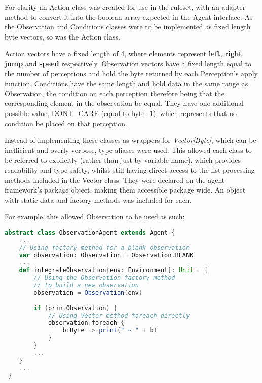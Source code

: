 For clarity an Action class was created for use in the ruleset, with an adapter method to convert it into the boolean array expected in the Agent interface. As the Observation and Conditions classes were to be implemented as fixed length byte vectors, so was the Action class.

Action vectors have a fixed length of 4, where elements represent \textbf{left}, \textbf{right}, \textbf{jump} and \textbf{speed} respectively. Observation vectors have a fixed length equal to the number of perceptions and hold the byte returned by each Perception's apply function. Conditions have the same length and hold data in the same range as Observation, the condition on each perception therefore being that the corresponding element in the observation be equal. They have one additional possible value, {\footnotesize DONT\_CARE} (equal to byte -1), which represents that no condition be placed on that perception.

Instead of implementing these classes as wrappers for \emph{Vector[Byte]}, which can be inefficient and overly verbose, type aliases were used. This allowed each class to be referred to explicitly (rather than just by variable name), which provides readability and type safety, whilst still having direct access to the list processing methods included in the Vector class. They were declared on the agent framework's package object, making them accessible package wide. An object with static data and factory methods was included for each.

For example, this allowed Observation to be used as such:

\begin{minipage}{0.9\linewidth}
\centering
\begin{lstlisting}[language=scala]
abstract class ObservationAgent extends Agent {
    ...
    // Using factory method for a blank observation
    var observation: Observation = Observation.BLANK
    ...
    def integrateObservation{env: Environment}: Unit = {
        // Using the Observation factory method 
        // to build a new observation
        observation = Observation(env)
        
        if (printObservation) {
            // Using Vector method foreach directly
            observation.foreach { 
                b:Byte => print(" ~ " + b)
            }
        } 
        ...
    }
    ...
 }

\end{lstlisting}
\end{minipage}


